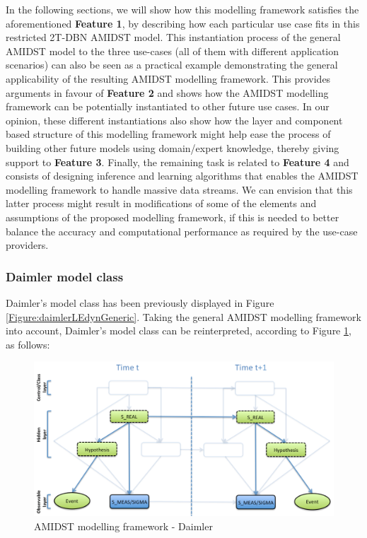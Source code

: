 In the following sections, we will show how this modelling framework satisfies the aforementioned \textbf{Feature 1}, by
describing how each particular use case fits in this restricted 2T-DBN AMIDST model. This instantiation process of the
general AMIDST model to the three use-cases (all of them with different application scenarios) can also be seen as a
practical example demonstrating the general applicability of the resulting AMIDST modelling framework. This provides
arguments in favour of \textbf{Feature 2} and shows how the AMIDST modelling framework can be potentially instantiated
to other future use cases. In our opinion, these different instantiations also show how the layer and component based
structure of this modelling framework might help ease the process of building other future models using domain/expert
knowledge, thereby giving support to \textbf{Feature 3}. Finally, the remaining task is related to
\textbf{Feature 4} and consists of designing inference and learning algorithms that enables  the AMIDST
modelling framework to handle massive data streams. We can envision that this latter process might result in
modifications of
some of the elements and assumptions of the proposed modelling framework, if this is needed to better balance the accuracy and
computational performance as required by the use-case providers.  



\subsubsection{Daimler model class}\label{daimlerAMIDSTModels}


Daimler's model class has been previously displayed in Figure \ref{Figure:daimlerLEdynGeneric}. Taking the general AMIDST modelling framework into account, Daimler's model class can be reinterpreted, according to Figure \ref{Figure:AMIDSTModelClassDaimler}, as follows:

\begin{figure}[ht!]
\begin{center}
\includegraphics[scale=0.39]{./figures/AMIDSTModelClassDaimler}
\caption{\label{Figure:AMIDSTModelClassDaimler} AMIDST modelling framework - Daimler}
\end{center}
\end{figure}

